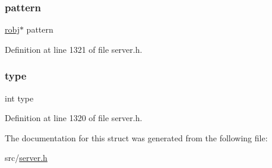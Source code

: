 \subsubsection{\texorpdfstring{pattern}{pattern}}
{\footnotesize\ttfamily \hyperlink{server_8h_a540f174d2685422fbd7d12e3cd44c8e2}{robj}$\ast$ pattern}



Definition at line 1321 of file server.\+h.

\mbox{\label{struct__redis_sort_operation_ac765329451135abec74c45e1897abf26}} 
\subsubsection{\texorpdfstring{type}{type}}
{\footnotesize\ttfamily int type}



Definition at line 1320 of file server.\+h.



The documentation for this struct was generated from the following file\+:\begin{DoxyCompactItemize}
\item 
src/\hyperlink{server_8h}{server.\+h}\end{DoxyCompactItemize}
